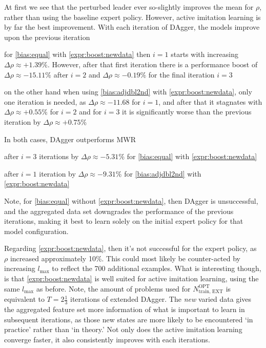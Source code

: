 \documentclass[twocolumn]{svjour3}
\begin{document}
At first we see that the perturbed leader ever so-slightly improves the mean 
for $\rho$, rather than using the baseline expert policy. 
However, active imitation learning is by far the best improvement. With each 
iteration of DAgger, the models improve upon the previous iteration
\begin{enumerate*}  
\item for \ref{bias:equal} with \ref{expr:boost:newdata} then $i=1$ starts 
with increasing  $\Delta\rho\approx+1.39\%$. However, after that first 
iteration there is a performance boost of $\Delta\rho\approx-15.11\%$ after 
$i=2$ and $\Delta\rho\approx-0.19\%$ for the final iteration $i=3$
\item on the other hand when using \ref{bias:adjdbl2nd} with 
\ref{expr:boost:newdata}, only one iteration 
is needed, as  $\Delta\rho\approx-11.68$ for $i=1$, and after that it stagnates 
with $\Delta\rho\approx+0.55\%$ for $i=2$ and for $i=3$ it is significantly 
worse than the previous iteration by $\Delta\rho\approx+0.75\%$
\end{enumerate*}
In both cases, DAgger outperforms MWR
\begin{enumerate*}
\item after $i=3$ iterations by $\Delta\rho\approx-5.31\%$ for 
\ref{bias:equal} with \ref{expr:boost:newdata}
\item after $i=1$ iteration by $\Delta\rho\approx-9.31\%$ for 
\ref{bias:adjdbl2nd} with \ref{expr:boost:newdata}
\end{enumerate*}
Note, for \ref{bias:equal} without \ref{expr:boost:newdata}, then DAgger is 
unsuccessful, and the aggregated data set downgrades the performance of the 
previous iterations, making it best to learn solely on the initial expert 
policy for that model configuration.

Regarding \ref{expr:boost:newdata}, then it's not successful for the expert 
policy, as $\rho$ increased approximately 10\%. This could most likely be 
counter-acted by increasing $l_{\max}$ to reflect the 700 additional examples.
What is interesting though, is that \ref{expr:boost:newdata} is well suited for active imitation learning, using the same $l_{\max}$ as before. 
Note, the amount of problems used for $N^{\text{OPT}}_{\text{train, EXT}}$ is equivalent to $T=2\tfrac{1}{3}$ iterations of extended DAgger.
The \emph{new} varied data gives the aggregated feature set more information 
of what is important to learn in subsequent iterations, as those new states are 
more likely to be encountered `in practice' rather than `in theory.' Not only 
does the active imitation learning converge faster, it also consistently 
improves with each iterations.
\end{document}
